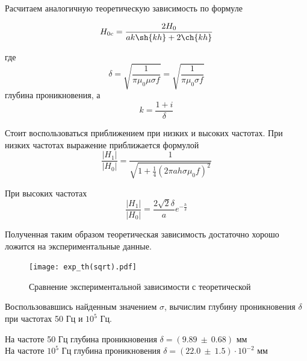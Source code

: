     Расчитаем аналогичную теоретическую зависимость по формуле

    \begin{equation}
        H_{0c} = \frac{2 H_0}{a k \sh{k h} + 2 \ch{k h}}
    \end{equation}

    где
    \begin{equation}
        \delta = \sqrt{\frac{1}{\pi \mu_0 \mu \sigma f}} = \sqrt{\frac{1}{\pi \mu_0 \sigma f}}
    \end{equation}
    глубина проникновения, а
    \begin{equation}
       k = \frac{1 + i}{\delta} 
    \end{equation}

    Стоит воспользоваться приближением при низких и высоких частотах. 
    При низких частотах выражение приближается формулой 
    \begin{equation}
        \frac{|H_1|}{|H_0|} = \frac{1}{\sqrt{1 + \frac{1}{4} (2 \pi a h \sigma \mu_0 f)^2}}
    \end{equation}

    При высоких частотах 
    \begin{equation}
        \frac{|H_1|}{|H_0|} = \frac{2 \sqrt{2} \delta}{a} e^{-\frac{h}{\delta}}
    \end{equation}

    Полученная таким образом теоретическая зависимость достаточно хорошо ложится на экспериментальные данные.

    \begin{figure}
        \centering
        \texttt{[image: exp\_th(sqrt).pdf]}
        \caption{Сравнение экспериментальной зависимости с теоретической}
        \label{exp_th(sqrt)}
    \end{figure}

    Воспользовавшись найденным значением $\sigma$, вычислим глубину проникновения $\delta$ при частотах 50 Гц и $10^5$ Гц.

    \begin{center}
        На частоте 50 Гц глубина проникновения $\delta = (9.89 ~ \pm ~ 0.68)$ мм \\
        На частоте $10^5$ Гц глубина проникновения $\delta = (22.0 ~ \pm ~ 1.5) \cdot 10^{-2}$ мм
    \end{center}
    
